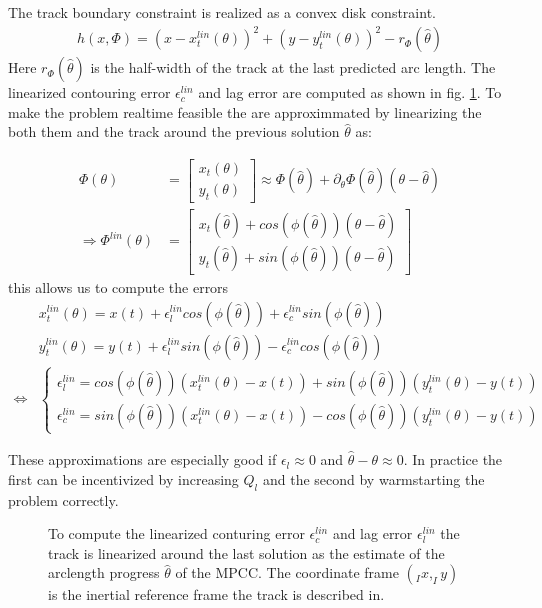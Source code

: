 \documentclass[12pt]{article}
\begin{document}
The track boundary constraint is realized as a convex disk constraint.
\begin{align}
h(x,\Phi) = (x-x_t^{lin}(\theta))^2 + (y-y_t^{lin}(\theta))^2 - r_{\Phi}(\hat{\theta})
\end{align}
Here $r_{\Phi}(\hat{\theta})$ is the half-width of the track at the last predicted arc length.
\newpage
The linearized contouring error $\epsilon_c^{lin}$ and lag error are computed as shown in fig. \ref{fig:contouring}. To make the problem realtime feasible the are approximmated by linearizing the both them and the track around the previous solution $\hat\theta$ as:

\begin{align}
\Phi(\theta) &= \begin{bmatrix}
x_t(\theta)\\y_t(\theta)
\end{bmatrix}\approx\Phi(\hat\theta) + \partial_{\theta} \Phi(\hat\theta)(\theta-\hat\theta) \\
\Rightarrow \Phi^{lin}(\theta) &= \begin{bmatrix}
x_t(\hat\theta)+cos(\phi(\hat\theta))(\theta-\hat\theta)\\
y_t(\hat\theta)+sin(\phi(\hat\theta))(\theta-\hat\theta)
\end{bmatrix} 
\end{align}
this allows us to compute the errors
\begin{align}
&x_t^{lin}(\theta) = x(t) + \epsilon^{lin}_lcos(\phi(\hat\theta))+ \epsilon^{lin}_csin(\phi(\hat\theta))\\
&y_t^{lin}(\theta) = y(t) + \epsilon^{lin}_lsin(\phi(\hat\theta))- \epsilon^{lin}_ccos(\phi(\hat\theta))\\
\Leftrightarrow &\begin{cases}
\epsilon^{lin}_l = cos(\phi(\hat\theta))(x_t^{lin}(\theta)-x(t))+sin(\phi(\hat\theta))(y_t^{lin}(\theta)-y(t))\\
\epsilon^{lin}_c = sin(\phi(\hat\theta))(x_t^{lin}(\theta)-x(t)) - cos(\phi(\hat\theta))(y_t^{lin}(\theta)-y(t))
\end{cases}
\end{align}

These approximations are especially good if $\epsilon_l\approx0$ and $\hat\theta-\theta \approx 0$. In practice the first can be incentivized by increasing $Q_l$ and the second by warmstarting the problem correctly. 



\begin{figure}[!h]
\centering

\caption{To compute the linearized conturing error $\epsilon_c^{lin}$ and lag error $\epsilon_l^{lin}$ the track is linearized around the last solution as the estimate of the arclength progress $\hat\theta$ of the MPCC. The coordinate frame $(_Ix,_Iy)$ is the inertial reference frame the track is described in.}

\label{fig:contouring}
\end{figure}
\end{document}
